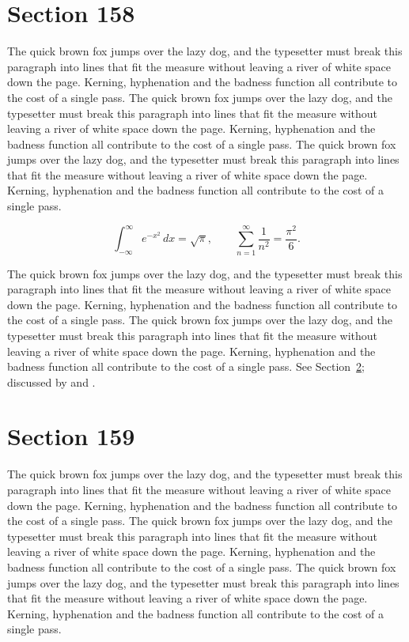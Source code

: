 \documentclass{article}
\begin{document}
\section{Section 158}
\label{sec:158}
The quick brown fox jumps over the lazy dog, and the typesetter must break this paragraph into lines that fit the measure without leaving a river of white space down the page. Kerning, hyphenation and the badness function all contribute to the cost of a single pass. The quick brown fox jumps over the lazy dog, and the typesetter must break this paragraph into lines that fit the measure without leaving a river of white space down the page. Kerning, hyphenation and the badness function all contribute to the cost of a single pass. The quick brown fox jumps over the lazy dog, and the typesetter must break this paragraph into lines that fit the measure without leaving a river of white space down the page. Kerning, hyphenation and the badness function all contribute to the cost of a single pass. 

\begin{equation}\label{eq:158}
\int_{-\infty}^{\infty} e^{-x^{2}}\,dx = \sqrt{\pi}, \qquad
\sum_{n=1}^{\infty} \frac{1}{n^{2}} = \frac{\pi^{2}}{6}.
\end{equation}

The quick brown fox jumps over the lazy dog, and the typesetter must break this paragraph into lines that fit the measure without leaving a river of white space down the page. Kerning, hyphenation and the badness function all contribute to the cost of a single pass. The quick brown fox jumps over the lazy dog, and the typesetter must break this paragraph into lines that fit the measure without leaving a river of white space down the page. Kerning, hyphenation and the badness function all contribute to the cost of a single pass. 
See Section~\ref{sec:159}; discussed by \textcite{k4} and \textcite{l1}.
\section{Section 159}
\label{sec:159}
The quick brown fox jumps over the lazy dog, and the typesetter must break this paragraph into lines that fit the measure without leaving a river of white space down the page. Kerning, hyphenation and the badness function all contribute to the cost of a single pass. The quick brown fox jumps over the lazy dog, and the typesetter must break this paragraph into lines that fit the measure without leaving a river of white space down the page. Kerning, hyphenation and the badness function all contribute to the cost of a single pass. The quick brown fox jumps over the lazy dog, and the typesetter must break this paragraph into lines that fit the measure without leaving a river of white space down the page. Kerning, hyphenation and the badness function all contribute to the cost of a single pass. 
\end{document}
